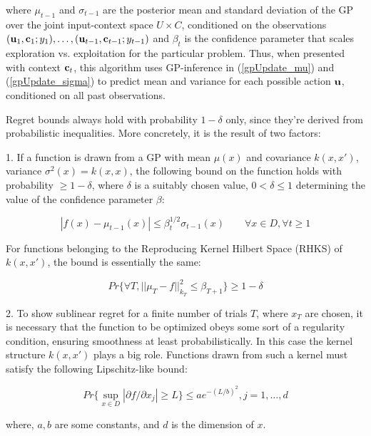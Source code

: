 where $\mu_{t-1}$ and $\sigma_{t-1}$ are the posterior mean and standard deviation of the GP over the joint input-context space $U \times C$, conditioned on the observations $(\mathbf{u}_1,\mathbf{c}_1; y_1),\ldots,(\mathbf{u}_{t-1},\mathbf{c}_{t-1}; y_{t-1})$ and $\beta_{t}$ is the confidence parameter that scales exploration vs. exploitation for the particular problem. Thus, when presented with context $\mathbf{c}_t$, this algorithm uses GP-inference in (\ref{gpUpdate_mu}) and (\ref{gpUpdate_sigma}) to predict mean and variance for each possible action $\mathbf{u}$, conditioned on all past observations.

Regret bounds always hold with probability $1-\delta$ only, since they're derived from probabilistic inequalities. More concretely, it is the result of two factors:

1. If a function is drawn from a GP with mean $\mu(x)$ and covariance $k(x,x')$, variance $\sigma^{2}(x) = k(x,x)$, the following bound on the function holds with probability $ \geq 	1 - \delta$, where $\delta$ is a suitably chosen value, $0 < \delta \leq 1$ determining the value of the confidence parameter $\beta$:

\begin{equation}
|f(x) - \mu_{t-1}(x)| \leq \beta_{t}^{1/2}\sigma_{t-1}(x) \qquad \forall x \in D, \forall t \geq 1
\label{function bound}
\end{equation}

For functions belonging to the Reproducing Kernel Hilbert Space (RHKS) of $k(x,x')$, the bound is essentially the same:

\begin{equation}
Pr \big\{ \forall T, ||\mu_{T} - f||_{k_{T}}^{2} \leq \beta_{T+1} \big\} \geq 1 - \delta
\end{equation}

2. To show sublinear regret for a finite number of trials $T$, where $x_{T}$ are chosen, it is necessary that the function to be optimized obeys some sort of a regularity condition, ensuring smoothness at least probabilistically. In this case the kernel structure $k(x,x')$ plays a big role. Functions drawn from such a kernel must satisfy the following Lipschitz-like bound:

\begin{equation}
Pr \big\{ \sup_{x \in D} |\partial f/\partial x_{j}| \geq L \big\} \leq a e^{-(L/b)^{2}}, j = 1, \ldots, d
\label{Lipschitz-like bound}
\end{equation}

where, $a,b$ are some constants, and $d$ is the dimension of $x$. 

